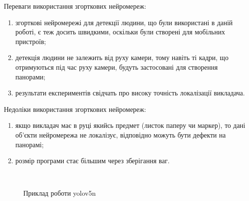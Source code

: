 Переваги використання згорткових нейромереж:
\begin{enumerate}
    \item згорткові нейромережі для детекції людини, що були використані в даній роботі,
          є теж досить швидкими, оскільки були створені для мобільних пристроїв;
        \item детекція людини не залежить від руху камери, тому навіть ті кадри, що
          отримуються під час руху камери, будуть застосовані для створення панорами;
    \item результати експериментів свідчать про високу точність локалізації викладача.
\end{enumerate}

Недоліки використання згорткових нейромереж:
\begin{enumerate}
    \item якщо викладач має в руці якийсь предмет (листок паперу чи маркер), то дані
          об'єкти нейромережа не локалізує, відповідно можуть бути дефекти на панорамі;
    \item розмір програми стає більшим через зберігання ваг.
\end{enumerate}

\begin{figure}[H]
    \centering
     \\
    \caption{Приклад роботи yolov5n
        \label{fig:yolov5n_examples}
    }
\end{figure}

